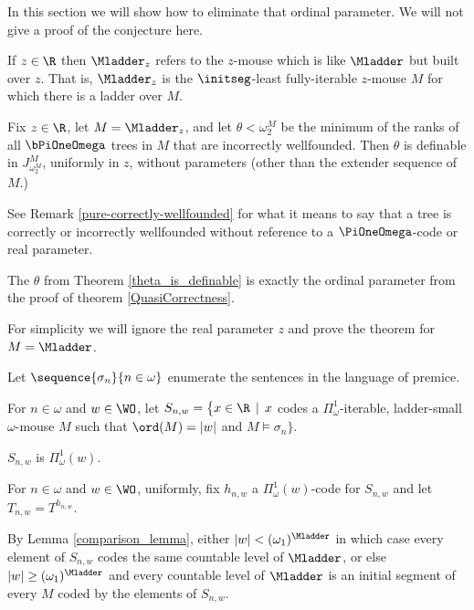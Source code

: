 \documentclass[oneside,12pt]{amsart}
\begin{document}
In this section we will show how to eliminate that ordinal parameter. We will not give a proof of the conjecture here.

\begin{definition}
If $z\in\R$ then $\Mladder_z$ refers to the $z$-mouse which is like $\Mladder$ but built over $z$.
That is, $\Mladder_z$ is the $\initseg$-least fully-iterable $z$-mouse $M$ for which there is
a ladder over $M$.
\end{definition}

\begin{theorem}
\label{theta_is_definable}
Fix $z\in\R$, let $M = \Mladder_z$, and let  $\theta<\omega_2^M$ be the
minimum of the ranks of all
$\bPiOneOmega$ trees in $M$ that are  incorrectly wellfounded.
Then $\theta$ is definable in $J^M_{\omega_2^M}$, uniformly in $z$,
without parameters (other than the extender sequence of $M$.)
\end{theorem}

\begin{note}
See Remark \ref{pure-correctly-wellfounded} for
what it means to say that a tree is correctly or incorrectly wellfounded
without reference to a $\PiOneOmega$-code or real parameter.
\end{note}

The $\theta$ from Theorem \ref{theta_is_definable} is exactly the ordinal parameter
from the proof of theorem \ref{QuasiCorrectness}.

For simplicity we will ignore the real parameter $z$ and prove the theorem for $M=\Mladder$.


\begin{definition}
Let $\sequence{\sigma_n}{n\in\omega}$ enumerate the sentences in the language of premice.

For $n\in\omega$ and $w\in\WO$, let
$S_{n,w}=\big\{x\in \R \,\mid\, x$  codes a $\Pi^1_{\omega}$-iterable,
ladder-small $\omega$-mouse $M$ such that $\ord(M)=|w|$ and  $M\models\sigma_n\big\}$.

$S_{n,w}$ is $\Pi^1_{\omega}(w)$.

For $n\in\omega$ and $w\in\WO$, uniformly, fix $h_{n,w}$ a $\Pi^1_{\omega}(w)$-code for $S_{n,w}$
and let $T_{n,w}=T^{h_{n,w}}$.
\end{definition}

\begin{remark}
By Lemma \ref{comparison_lemma}, either $|w| < (\omega_1)^{\Mladder}$
in which case every element of $S_{n,w}$ codes the same countable level of $\Mladder$, or else
$|w| \geq (\omega_1)^{\Mladder}$ and every countable level of $\Mladder$ is an initial segment
of every $M$ coded by the elements of $S_{n,w}$.
\end{remark}
\end{document}

